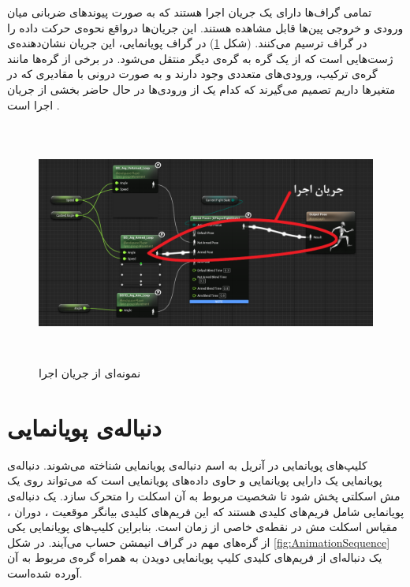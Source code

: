تمامی گراف‌ها دارای یک جریان اجرا هستند که به صورت پیوند‌های ضربانی 
میان ورودی و خروجی پین‌ها قابل مشاهده هستند. این جریان‌ها درواقع نحوه‌ی حرکت داده
را در گراف ترسیم می‌کنند.
(شکل \ref{fig:ExecFlow})
در گراف پویانمایی، این جریان نشان‌دهنده‌ی ‌ژست‌هایی است که از 
یک گره به گره‌ی دیگر منتقل می‌شود.
در برخی از گره‌‌ها مانند گره‌ی ترکیب، ورودی‌های متعددی وجود دارند و به صورت 
درونی با مقادیری که در متغیر‌ها داریم تصمیم می‌گیرند که کدام یک از ورودی‌‌ها 
در حال حاضر بخشی از جریان اجرا است \cite{AnimationGraphUnrealEngine}.

\begin{figure}[ht]
	\centerline{\includegraphics[width=\textwidth,height=8cm,keepaspectratio]{Figures/Ch3/ExecFlow.png}}

	\caption{نمونه‌ای از جریان اجرا}
	\label{fig:ExecFlow}
\end{figure}





\section {دنباله‌ی پویانمایی}

کلیپ‌های پویانمایی در آنریل به اسم دنباله‌ی پویانمایی شناخته می‌شوند.
دنباله‌ی پویانمایی یک دارایی پویانمایی و  
حاوی داده‌‌های پویانمایی است که می‌تواند روی 
یک مش اسکلتی پخش شود تا شخصیت مربوط 
به آن اسکلت را متحرک سازد.
یک دنباله‌ی پویانمایی شامل فریم‌های کلیدی هستند که 
این فریم‌های کلیدی بیانگر موقعیت
، دوران 
، مقیاس
اسکلت مش در نقطه‌‌ی خاصی از زمان است.
بنابراین کلیپ‌های پویانمایی یکی از گره‌های مهم در 
گراف انیمشن حساب می‌آیند.
در شکل 
\ref{fig:AnimationSequence}
یک دنباله‌ای از فریم‌‌‌های کلیدی کلیپ پویانمایی دویدن به همراه 
گره‌ی مربوط به آن آورده شده‌است.

